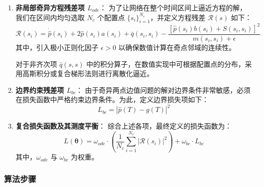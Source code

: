 \documentclass{GZUbachelorthesis}
\begin{document}
\begin{enumerate}[label=(\arabic*)]
	\item \textbf{非局部奇异方程残差项 $L_{ode}$}：
	为了让网络在整个时间区间上逼近方程的解，我们在区间内均匀选取 $N_c$ 个配置点 $\{s_i\}_{i=1}^{N_c}$，并定义方程残差 $\mathcal{R}(s)$ 如下：
	\begin{equation}
		\mathcal{R}(s_i) = \dot{\hat{p}}(s_i) + 2\hat{p}(s_i)a(s_i) + \bar{q}(s_i, s_i) - \frac{[\hat{p}(s_i)b(s_i) + S(s_i, s_i)]^2}{m(s_i, s_i) + \epsilon}
	\end{equation}
	其中，引入极小正则化因子 $\epsilon > 0$ 以确保数值计算在奇点邻域的连续性。
	
	对于非齐次项 $\bar{q}(s,s)$ 中的积分算子，在数值实现中可根据配置点的分布，采用高斯积分或复合梯形法则进行离散化逼近。
	
	\item \textbf{边界约束残差项 $L_{bc}$}：
	由于奇异两点边值问题的解对边界条件非常敏感，必须在损失函数中严格约束边界条件。为此，定义边界损失项如下：
	\begin{equation}
		L_{bc} = | \hat{p}(T) - g(T) |^2
	\end{equation}
	\item \textbf{复合损失函数及其测度平衡}：
	综合上述各项，最终定义的损失函数为：
	\begin{equation}\label{4.18}
		L(\boldsymbol{\theta}) = \omega_{ode} \cdot \left( \frac{1}{N_c} \sum_{i=1}^{N_c} | \mathcal{R}(s_i) |^2 \right) + \omega_{bc} \cdot L_{bc}
	\end{equation}
	其中，$\omega_{ode}$ 与 $\omega_{bc}$ 为权重。
\end{enumerate}

\subsubsection{算法步骤}
\end{document}
